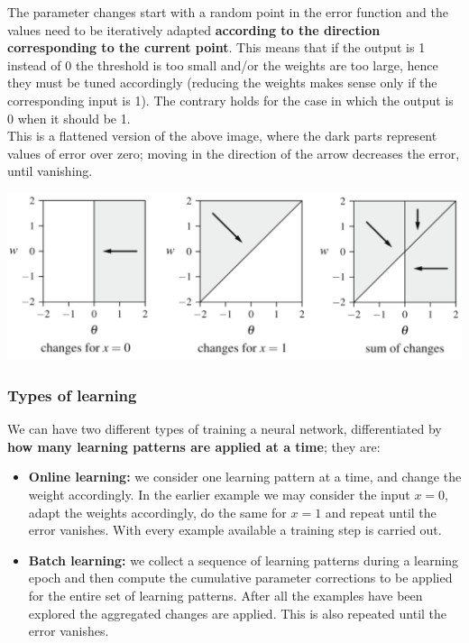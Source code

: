 The parameter changes start with a random point in the error function and the values need to be iteratively adapted \textbf{according to the direction corresponding to the current point}. This means that if the output is 1 instead of 0 the threshold is too small and/or the weights are too large, hence they must be tuned accordingly (reducing the weights makes sense only if the corresponding input is 1). The contrary holds for the case in which the output is 0 when it should be 1.\\

This is a flattened version of the above image, where the dark parts represent values of error over zero; moving in the direction of the arrow decreases the error, until vanishing.
\begin{center}
	\includegraphics[width=0.8\columnwidth]{img/NN/error3}
\end{center}

\newpage

\subsubsection{Types of learning}
We can have two different types of training a neural network, differentiated by \textbf{how many learning patterns are applied at a time}; they are:
\begin{itemize}
	\item \textbf{Online learning:} we consider one learning pattern at a time, and change the weight accordingly. In the earlier example we may consider the input $x=0$, adapt the weights accordingly, do the same for $x=1$ and repeat until the error vanishes. With every example available a training step is carried out.\\
	
	\item \textbf{Batch learning:} we collect a sequence of learning patterns during a learning epoch and then compute the cumulative parameter corrections to be applied for the entire set of learning patterns. After all the examples have been explored the aggregated changes are applied. This is also repeated until the error vanishes.\\
\end{itemize}

